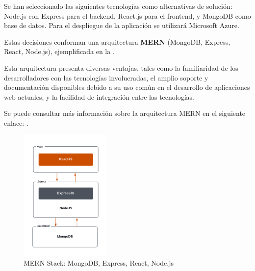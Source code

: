 
Se han seleccionado las siguientes tecnologías como alternativas de solución: Node.js con Express para el backend, React.js para el frontend, y MongoDB como base 
de datos. Para el despliegue de la aplicación se utilizará Microsoft Azure.

Estas decisiones conforman una arquitectura \textbf{MERN} (MongoDB, Express, React, Node.js), ejemplificada en la . 

Esta arquitectura presenta diversas ventajas, tales como la familiaridad de los desarrolladores con las tecnologías involucradas, el amplio soporte y documentación disponibles debido a su uso común en el desarrollo de aplicaciones web actuales,
y la facilidad de integración entre las tecnologías.

Se puede consultar más información sobre la arquitectura MERN en el siguiente enlace: .

\begin{figure}[H]
    \centering
    \includegraphics[width=0.4\textwidth]{figures/4-Estudio-viabilidad/4_MERN2.png}
    \caption{MERN Stack: MongoDB, Express, React, Node.js}
    \label{fig:arquitectura_mern}
    \hypertarget{fig:arquitectura_mern}{}
\end{figure}
